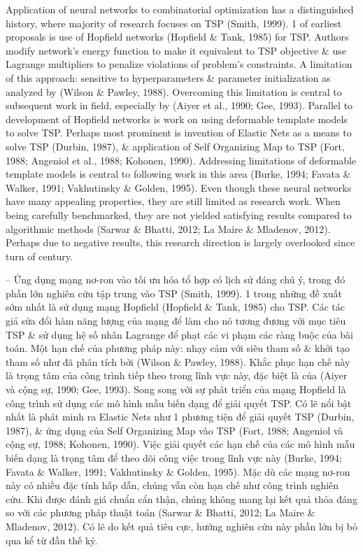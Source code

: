 \documentclass{article}
\begin{document}
\begin{itemize}
    Application of neural networks to combinatorial optimization has a distinguished history, where majority of research focuses on TSP (Smith, 1999). 1 of earliest proposals is use of Hopfield networks (Hopfield \& Tank, 1985) for TSP. Authors modify network's energy function to make it equivalent to TSP objective \& use Lagrange multipliers to penalize violations of problem's constraints. A limitation of this approach: sensitive to hyperparameters \& parameter initialization as analyzed by (Wilson \& Pawley,
    1988). Overcoming this limitation is central to subsequent work in field, especially by (Aiyer et al., 1990; Gee, 1993). Parallel to development of Hopfield networks is work on using deformable template models to solve TSP. Perhaps most prominent is invention of Elastic Nets as a means to solve TSP (Durbin, 1987), \& application of Self Organizing Map to TSP (Fort, 1988; Angeniol et al., 1988; Kohonen, 1990). Addressing limitations of deformable template models is central to following work in this area (Burke, 1994; Favata \& Walker, 1991; Vakhutinsky \& Golden, 1995). Even though these neural networks have many appealing properties, they are still limited as research work. When being carefully benchmarked, they are not yielded satisfying results compared to algorithmic methods (Sarwar \& Bhatti, 2012; La Maire \& Mladenov, 2012). Perhaps due to negative results, this research direction is largely overlooked since turn of century.
    
    -- Ứng dụng mạng nơ-ron vào tối ưu hóa tổ hợp có lịch sử đáng chú ý, trong đó phần lớn nghiên cứu tập trung vào TSP (Smith, 1999). 1 trong những đề xuất sớm nhất là sử dụng mạng Hopfield (Hopfield \& Tank, 1985) cho TSP. Các tác giả sửa đổi hàm năng lượng của mạng để làm cho nó tương đương với mục tiêu TSP \& sử dụng hệ số nhân Lagrange để phạt các vi phạm các ràng buộc của bài toán. Một hạn chế của phương pháp này: nhạy cảm với siêu tham số \& khởi tạo tham số như đã phân tích bởi (Wilson \& Pawley,
    1988). Khắc phục hạn chế này là trọng tâm của công trình tiếp theo trong lĩnh vực này, đặc biệt là của (Aiyer và cộng sự, 1990; Gee, 1993). Song song với sự phát triển của mạng Hopfield là công trình sử dụng các mô hình mẫu biến dạng để giải quyết TSP. Có lẽ nổi bật nhất là phát minh ra Elastic Nets như 1 phương tiện để giải quyết TSP (Durbin, 1987), \& ứng dụng của Self Organizing Map vào TSP (Fort, 1988; Angeniol và cộng sự, 1988; Kohonen, 1990). Việc giải quyết các hạn chế của các mô hình mẫu biến dạng là trọng tâm để theo dõi công việc trong lĩnh vực này (Burke, 1994; Favata \& Walker, 1991; Vakhutinsky \& Golden, 1995). Mặc dù các mạng nơ-ron này có nhiều đặc tính hấp dẫn, chúng vẫn còn hạn chế như công trình nghiên cứu. Khi được đánh giá chuẩn cẩn thận, chúng không mang lại kết quả thỏa đáng so với các phương pháp thuật toán (Sarwar \& Bhatti, 2012; La Maire \& Mladenov, 2012). Có lẽ do kết quả tiêu cực, hướng nghiên cứu này phần lớn bị bỏ qua kể từ đầu thế kỷ.
    

\end{itemize}
\end{document}
